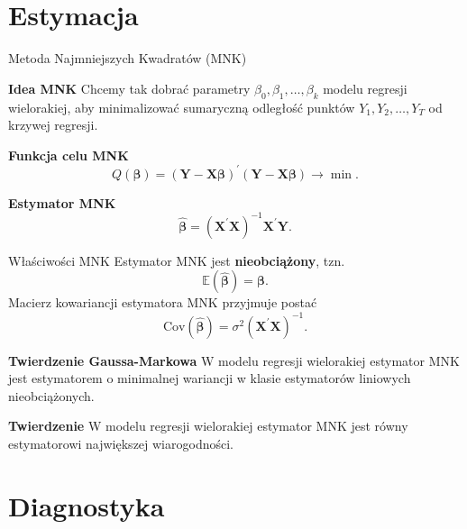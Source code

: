 \documentclass[a4paper, 11pt]{beamer}
\begin{document}
	\section{Estymacja}

	\begin{frame}{Metoda Najmniejszych Kwadratów (MNK)}
		\begin{alert}{\textbf{Idea MNK}}
			Chcemy tak dobrać parametry $\beta_0, \beta_1, \ldots, \beta_k$ modelu regresji wielorakiej,
			aby minimalizować sumaryczną odległość punktów $Y_1, Y_2, \ldots, Y_T$ od krzywej regresji.
		\end{alert}
		\begin{block}{\textbf{Funkcja celu MNK}}
			\[
				Q\left(\boldsymbol{\beta}\right) = 
				\left(\boldsymbol{Y} - \boldsymbol{X} \boldsymbol{\beta}\right)^{\prime}
				\left(\boldsymbol{Y} - \boldsymbol{X} \boldsymbol{\beta}\right)
				\rightarrow \min.
			\]
		\end{block}
		\begin{block}{\textbf{Estymator MNK}}
			\[
				\hat{\boldsymbol{\beta}} = \left(\boldsymbol{X}^{\prime} \boldsymbol{X}\right)^{-1} \boldsymbol{X}^{\prime} \boldsymbol{Y}.
			\]
		\end{block}
	\end{frame}
	
	\begin{frame}{Właściwości MNK}
		Estymator MNK jest \textbf{nieobciążony}, tzn. \[
			\mathbb{E}\left(\hat{\boldsymbol{\beta}}\right) = \boldsymbol{\beta}.
		\]
		Macierz kowariancji estymatora MNK przyjmuje postać \[
			\mbox{Cov}\left(\hat{\boldsymbol{\beta}}\right) = \sigma^2 \left(\boldsymbol{X}^{\prime} \boldsymbol{X}\right)^{-1}.
		\]
		\begin{block}{\textbf{Twierdzenie Gaussa-Markowa}}
			W modelu regresji wielorakiej estymator MNK jest estymatorem o minimalnej wariancji w klasie estymatorów liniowych nieobciążonych.
		\end{block}
		\begin{block}{\textbf{Twierdzenie}}
			W modelu regresji wielorakiej estymator MNK jest równy estymatorowi największej wiarogodności.
		\end{block}
	\end{frame}
	
	\section{Diagnostyka}
	
\end{document}

